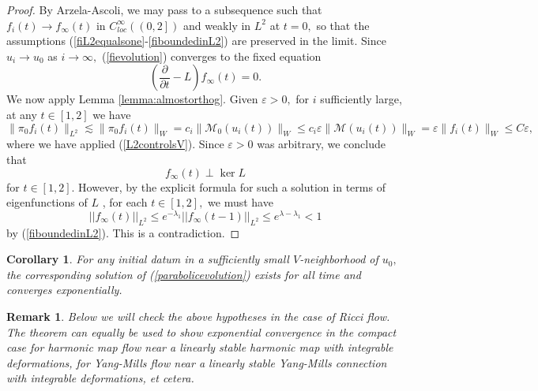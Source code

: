 \documentclass[12pt]{amsart}
\newcommand{\calM}{\mathcal{M}}
\newcommand{\LB}{\left[}
\newcommand{\RB}{\right]}
\renewcommand{\1}{{\mathbf 1}}
\newcommand{\eps}{{\varepsilon}}
\newtheorem{cor}[thm]{Corollary}
\theoremstyle{others}
\newtheorem{rmk}[thm]{Remark}
\numberwithin{equation}{section}
\begin{document}
\begin{proof}
By Arzela-Ascoli, we may pass to a subsequence such that $f_i(t) \to f_\infty(t)$ in $C^\infty_{loc}\left( \left( 0 , 2 \RB \right)$ and weakly in $L^2$ at $t = 0,$
so that the assumptions (\ref{fiL2equalsone}-\ref{fiboundedinL2}) are preserved in the limit. Since $u_i \to u_0$ as $i \to \infty,$ (\ref{fievolution}) converges to the fixed equation
$$\left( \frac{\partial}{\partial t} - L \right) f_\infty(t) = 0.$$
We now apply Lemma \ref{lemma:almostorthog}. Given $\eps > 0,$ for $i$ sufficiently large, at any $t \in \LB 1,2 \RB$ we have 
$$ \| \pi_0 f_i(t) \|_{L^2} \lesssim \| \pi_0 f_i(t) \|_W = c_i \| \calM_0(u_i(t)) \|_W \leq c_i \eps \|\calM(u_i(t)) \|_W = \eps \| f_i(t) \|_{W} \leq C \eps,$$
where we have applied (\ref{L2controlsV}). %
Since $\eps > 0$ was arbitrary, we conclude that
$$f_\infty(t) \perp \ker L $$
for $t \in \LB 1, 2 \RB.$ However, by the explicit formula for such a solution %
in terms of eigenfunctions of $L$ \cite[(1.20-21)]{Simon83}, for each $t \in \LB 1,2 \RB,$ we must have
$$||f_\infty(t)||_{L^2} \leq e^{-\lambda_1} ||f_\infty(t-1)||_{L^2} \leq e^{\lambda - \lambda_1} < 1$$
by (\ref{fiboundedinL2}). This is a contradiction.
\end{proof}


\begin{cor}\label{cor:exponentialconvergence}
    For any initial datum in a sufficiently small $V$-neighborhood of $u_0,$ the corresponding solution of (\ref{parabolicevolution}) exists for all time and converges exponentially.
\end{cor}

\begin{rmk}
    Below we will check the above hypotheses in the case of Ricci flow. The theorem can equally be used to show exponential convergence in the compact case for harmonic map flow near a linearly stable harmonic map with integrable deformations, for Yang-Mills flow near a linearly stable Yang-Mills connection with integrable deformations, \it{et cetera}.
\end{rmk}
\end{document}
